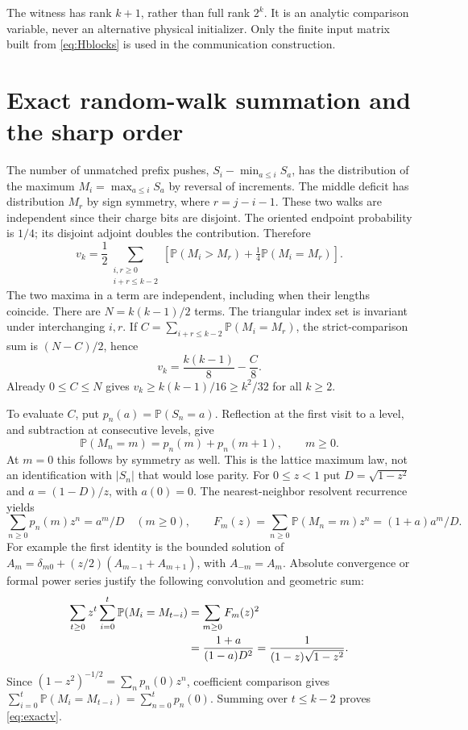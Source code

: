 \documentclass[11pt]{article}
\newcommand{\Prob}{\mathbb P}
\begin{document}
The witness has rank $k+1$, rather than full rank $2^k$. It is an
analytic comparison variable, never an alternative physical initializer.
Only the finite input matrix built from \eqref{eq:Hblocks} is used in
the communication construction.

\section{Exact random-walk summation and the sharp order}

The number of unmatched prefix pushes, $S_i-\min_{a\le i}S_a$, has
the distribution of the maximum $M_i=\max_{a\le i}S_a$ by reversal
of increments. The middle deficit has distribution $M_r$ by sign
symmetry, where $r=j-i-1$. These two walks are independent since their
charge bits are disjoint. The oriented endpoint probability is $1/4$;
its disjoint adjoint doubles the contribution. Therefore
\begin{equation}\label{eq:walksum}
 v_k=\frac12\sum_{\substack{i,r\ge0\\i+r\le k-2}}
 \left[\Prob(M_i>M_r)+\tfrac14\Prob(M_i=M_r)\right].
\end{equation}
The two maxima in a term are independent, including when their lengths
coincide. There are $N=k(k-1)/2$ terms. The triangular index set is
invariant under interchanging $i,r$. If
$C=\sum_{i+r\le k-2}\Prob(M_i=M_r)$, the strict-comparison sum is
$(N-C)/2$, hence
\begin{equation}\label{eq:collision}
 v_k=\frac{k(k-1)}8-\frac C8.
\end{equation}
Already $0\le C\le N$ gives
$v_k\ge k(k-1)/16\ge k^2/32$ for all $k\ge2$.

To evaluate $C$, put $p_n(a)=\Prob(S_n=a)$. Reflection at the first
visit to a level, and subtraction at consecutive levels, give
\begin{equation}\label{eq:maxlaw}
 \Prob(M_n=m)=p_n(m)+p_n(m+1),\qquad m\ge0.
\end{equation}
At $m=0$ this follows by symmetry as well. This is the lattice maximum
law, not an identification with $|S_n|$ that would lose parity.
For $0\le z<1$ put $D=\sqrt{1-z^2}$ and $a=(1-D)/z$, with
$a(0)=0$. The nearest-neighbor resolvent recurrence yields
\[
 \sum_{n\ge0}p_n(m)z^n=a^m/D\quad(m\ge0),\qquad
 F_m(z)=\sum_{n\ge0}\Prob(M_n=m)z^n=(1+a)a^m/D.
\]
For example the first identity is the bounded solution of
$A_m=\delta_{m0}+(z/2)(A_{m-1}+A_{m+1})$, with $A_{-m}=A_m$.
Absolute convergence or formal power series justify the following
convolution and geometric sum:
\begin{align}
 \sum_{t\ge0}z^t\sum_{i=0}^t\Prob(M_i=M_{t-i})
 &=\sum_{m\ge0}F_m(z)^2\notag\\
 &=\frac{1+a}{(1-a)D^2}
  =\frac1{(1-z)\sqrt{1-z^2}}.\label{eq:GF}
\end{align}
Since $(1-z^2)^{-1/2}=\sum_n p_n(0)z^n$, coefficient comparison gives
$\sum_{i=0}^t\Prob(M_i=M_{t-i})=\sum_{n=0}^t p_n(0)$.
Summing over $t\le k-2$ proves \eqref{eq:exactv}.
\end{document}
